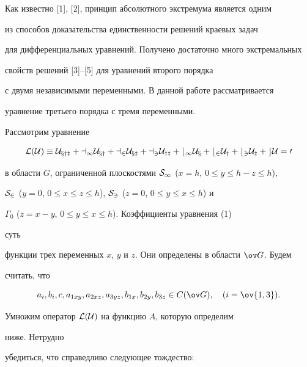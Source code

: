 \label{begin} 


 


Как известно [1], [2], принцип абсолютного экстремума является одним 


из способов доказательства единственности решений краевых задач 


для дифференциальных уравнений. Получено достаточно много экстремальных 


свойств решений [3]--[5] для уравнений второго порядка 


с двумя независимыми переменными. В данной работе рассматривается 


уравнение третьего порядка с тремя переменными. 


 


Рассмотрим уравнение 


\begin{equation} 


\cal L(\cal U)\equiv\cal U_{xyz}+a_1\cal U_{xy}+ 


a_2\cal U_{xz}+a_3\cal U_{yz}+b_1\cal U_x 


+b_2\cal U_y+b_3\cal U_z+c\cal U=0 


\end{equation} 


в области $G$, ограниченной плоскостями $\cal S_1$ ($x=h$, $0\le y\le 


h-z\le h$), 


$\cal S_2$ ($y=0$, $0\le x\le z\le h$), $\cal S_3$ ($z=0$, $0\le y\le 


x\le h$) и 


$\Gamma_0$ ($z=x-y$, $0\le y\le x\le h$). Коэффициенты уравнения (1) 


суть 


функции трех переменных $x$, $y$ и $z$. Они определены в области $\ov 


G$. Будем 


считать, что 


$$ 


a_i,b_i,c,a_{1{xy}},a_{2{xz}},a_{3{yz}}, 


b_{1x},b_{2y},b_{3z}\in C(\ov G),\quad (i=\ov {1,3}). 


$$ 


Умножим оператор $\cal L(\cal U)$ на функцию $A$, которую определим 


ниже. Нетрудно 


убедиться, что справедливо следующее тождество: 


